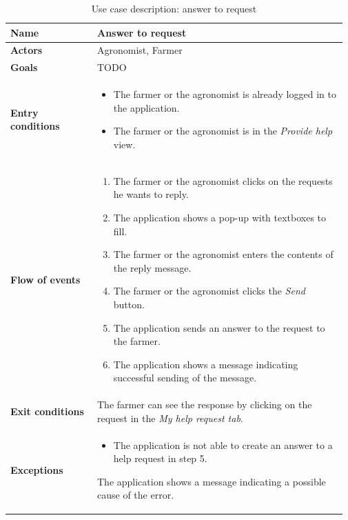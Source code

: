 \begin{table}[H]
    \centering
	\begin{tabular}{@{}p{0.25\linewidth} p{0.72\linewidth}@{}}
\toprule
		\textbf{Name}               & Answer to request\\
		\midrule
		\textbf{Actors}             & Agronomist, Farmer\\
		\midrule
		\textbf{Goals}              & TODO \\
		\midrule
		
		\textbf{Entry conditions}   & \begin{itemize}[leftmargin=.4cm,noitemsep,topsep=0pt,before=\vspace{-3mm},after=\vspace{-4mm}]
		    \item The farmer or the agronomist is already logged in to the application.
		    \item The farmer or the agronomist is in the \textit{Provide help} view.
		\end{itemize}\\
		\midrule
		
		\textbf{Flow of events}     & \begin{enumerate}[leftmargin=.4cm,noitemsep,topsep=0pt,before=\vspace{-3mm},after=\vspace{-4mm}]
		    \item The farmer or the agronomist clicks on the requests he wants to reply. 
		    \item The application shows a pop-up with textboxes to fill.
		    \item The farmer or the agronomist enters the contents of the reply message.
		    \item The farmer or the agronomist clicks the \textit{Send} button.
		    \item The application sends an answer to the request to the farmer.
		    \item The application shows a message indicating successful sending of the message.
		\end{enumerate}\\
		\midrule
		\textbf{Exit conditions}    & The farmer can see the response by clicking on the request in the \textit{My help request tab}. \\
		\midrule
		
		\textbf{Exceptions}         & 
	    \begin{itemize}[leftmargin=.4cm,noitemsep,topsep=0pt,before=\vspace{-3mm}]
		   \item The application is not able to create an answer to a help request in step 5. 
		\end{itemize}
		The application shows a message indicating a possible cause of the error.
		\\\bottomrule
	\end{tabular}
	\caption{Use case description: answer to request} 
\end{table}


